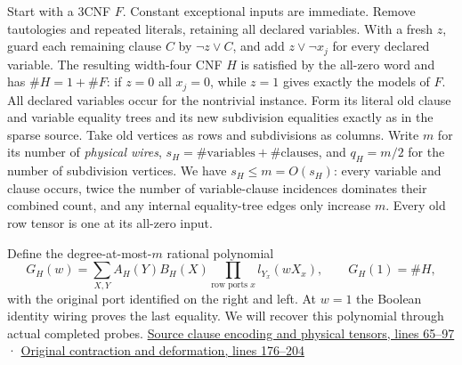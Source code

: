 \documentclass[11pt,a4paper]{article}
\begin{document}
Start with a 3CNF \(F\). Constant exceptional inputs are immediate.
Remove tautologies and repeated literals, retaining all declared
variables. With a fresh \(z\), guard each remaining clause \(C\) by
\(\neg z\lor C\), and add \(z\lor\neg x_j\) for every declared variable.
The resulting width-four CNF \(H\) is satisfied by the all-zero word and
has \(\#H=1+\#F\): if \(z=0\) all \(x_j=0\), while \(z=1\) gives exactly
the models of \(F\). All declared variables occur for the nontrivial
instance. Form its literal old clause and variable equality trees and
its new subdivision equalities exactly as in the sparse source. Take old
vertices as rows and subdivisions as columns. Write \(m\) for its number
of \emph{physical wires},
\(s_H=\#\mathrm{variables}+\#\mathrm{clauses}\), and \(q_H=m/2\) for the
number of subdivision vertices. We have \(s_H\le m=O(s_H)\): every
variable and clause occurs, twice the number of variable-clause
incidences dominates their combined count, and any internal
equality-tree edges only increase \(m\). Every old row tensor is one at
its all-zero input.

Define the degree-at-most-\(m\) rational polynomial \[
 G_H(w)=\sum_{X,Y}A_H(Y)B_H(X)
                 \prod_{\text{row ports }x} l_{Y_x}(wX_x),
                 \qquad G_H(1)=\#H ,
\] with the original port identified on the right and left. At \(w=1\)
the Boolean identity wiring proves the last equality. We will recover
this polynomial through actual completed probes.
\href{https://github.com/openai/math/blob/main/preprints/The-Exponential-Time-Hypothesis-is-False-October-25-2026/build/quantitative-reduction.tex\#L65}{Source
clause encoding and physical tensors, lines 65--97} ·
\href{https://github.com/openai/math/blob/main/preprints/The-Exponential-Time-Hypothesis-is-False-October-25-2026/build/quantitative-contraction.tex\#L176}{Original
contraction and deformation, lines 176--204}
\end{document}
